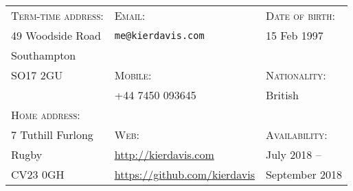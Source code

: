 \vspace{-1em}
\hrulefill
\vspace{1em}

{
  \newcommand{\h}[1]{\textsc{#1}:}
  \newcommand{\n}[1]{\hspace{.8em} #1}
  \begin{tabu} to \textwidth {X[1.4,l] X[2.3,l] X[1.4,l]}
    \h{Term-time address} & \h{Email}                                 & \h{Date of birth}  \\
    \n{49 Woodside Road}  & \n{\texttt{me@kierdavis.com}}             & \n{15 Feb 1997}    \\
    \n{Southampton}       &                                           &                    \\
    \n{SO17 2GU}          & \h{Mobile}                                & \h{Nationality}    \\
                          & \n{+44 7450 093645}                       & \n{British}        \\
    \h{Home address}      &                                           &                    \\
    \n{7 Tuthill Furlong} & \h{Web}                                   & \h{Availability}   \\
    \n{Rugby}             & \n{\url{http://kierdavis.com}}            & \n{July 2018 --}   \\
    \n{CV23 0GH}          & \n{\url{https://github.com/kierdavis}}    & \n{September 2018} \\
  \end{tabu}
}

\hrulefill
